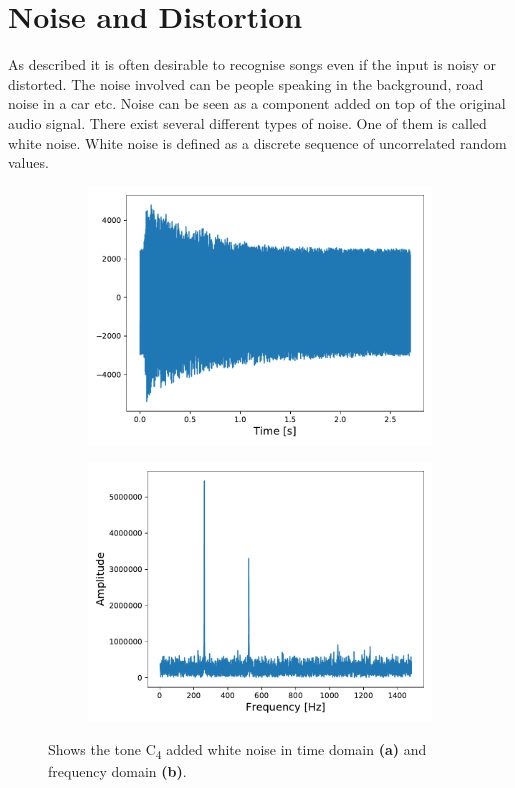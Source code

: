 \section{Noise and Distortion}
As described it is often desirable to recognise songs even if the input is noisy or distorted. The noise involved can be people speaking in the background, road noise in a car etc. Noise can be seen as a component added on top of the original audio signal. There exist several different types of noise. One of them is called white noise. White noise is defined as a discrete sequence of uncorrelated random values.
\begin{figure}[H]
    \centering
    \begin{subfigure}[b]{.49\textwidth}
        \includegraphics[width=\textwidth]{figures/C4audioNoise.pdf}
         \caption{}
        \label{fig:c4timeNoise}
    \end{subfigure}
    \begin{subfigure}[b]{.5\textwidth}
        \includegraphics[width=\textwidth]{figures/C4freqNoise.pdf}
        \caption{}
        \label{fig:c4freqNoise}
    \end{subfigure}
\caption{Shows the tone C\textsubscript{4} added white noise in time domain \textbf{(a)} and frequency domain \textbf{(b)}.}
\label{fig:c4Noise}

\end{figure}
